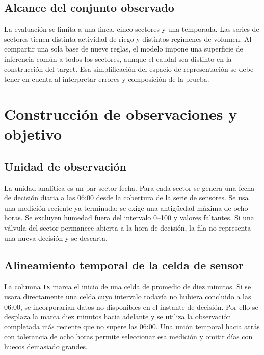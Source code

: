 \documentclass[11pt,letterpaper]{article}
\newcommand{\codigo}[1]{\texttt{\small #1}}
\begin{document}
\subsection{Alcance del conjunto observado}
La evaluación se limita a una finca, cinco sectores y una temporada. Las series de sectores tienen distinta actividad de riego y distintos regímenes de volumen. Al compartir una sola base de nueve reglas, el modelo impone una superficie de inferencia común a todos los sectores, aunque el caudal sea distinto en la construcción del target. Esa simplificación del espacio de representación se debe tener en cuenta al interpretar errores y composición de la prueba.

\section{Construcción de observaciones y objetivo}
\subsection{Unidad de observación}
La unidad analítica es un par sector-fecha. Para cada sector se genera una fecha de decisión diaria a las 06:00 desde la cobertura de la serie de sensores. Se usa una medición reciente ya terminada; se exige una antigüedad máxima de ocho horas. Se excluyen humedad fuera del intervalo 0--100 y valores faltantes. Si una válvula del sector permanece abierta a la hora de decisión, la fila no representa una nueva decisión y se descarta.

\subsection{Alineamiento temporal de la celda de sensor}
La columna \codigo{ts} marca el inicio de una celda de promedio de diez minutos. Si se usara directamente una celda cuyo intervalo todavía no hubiera concluido a las 06:00, se incorporarían datos no disponibles en el instante de decisión. Por ello se desplaza la marca diez minutos hacia adelante y se utiliza la observación completada más reciente que no supere las 06:00. Una unión temporal hacia atrás con tolerancia de ocho horas permite seleccionar esa medición y omitir días con huecos demasiado grandes.
\end{document}

